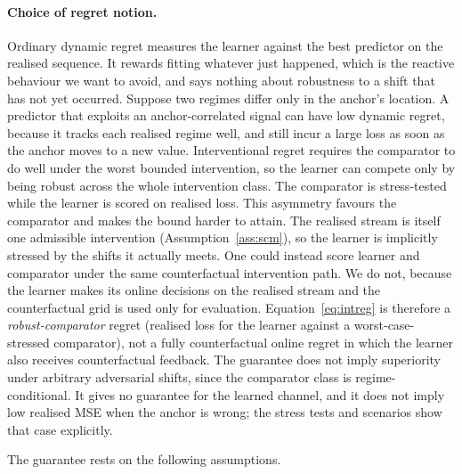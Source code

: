\documentclass[11pt]{article}
\theoremstyle{plain}
\theoremstyle{remark}
\begin{document}
\paragraph{Choice of regret notion.} Ordinary dynamic regret measures the learner
against the best predictor on the realised sequence. It rewards fitting whatever just
happened, which is the reactive behaviour we want to avoid, and says nothing about
robustness to a shift that has not yet occurred. Suppose two regimes differ only in
the anchor's location. A predictor that exploits an anchor-correlated signal can have
low dynamic regret, because it tracks each realised regime well, and still incur a
large loss as soon as the anchor moves to a new value. Interventional regret requires
the comparator to do well under the worst bounded intervention, so the learner can
compete only by being robust across the whole intervention class. The comparator is
stress-tested while the learner is scored on realised loss. This asymmetry favours the
comparator and makes the bound harder to attain. The realised stream is itself one
admissible intervention (Assumption~\ref{ass:scm}), so the learner is implicitly
stressed by the shifts it actually meets. One could instead score learner and
comparator under the same counterfactual intervention path. We do not, because the
learner makes its online decisions on the realised stream and the counterfactual grid
is used only for evaluation. Equation~\eqref{eq:intreg} is therefore a
\emph{robust-comparator} regret (realised loss for the learner against a
worst-case-stressed comparator), not a fully counterfactual online regret in which the
learner also receives counterfactual feedback. The guarantee does not imply
superiority under arbitrary adversarial shifts, since the comparator class is
regime-conditional. It gives no guarantee for the learned channel, and it does not
imply low realised MSE when the anchor is wrong; the stress tests and scenarios show
that case explicitly.

The guarantee rests on the following assumptions.
\end{document}
